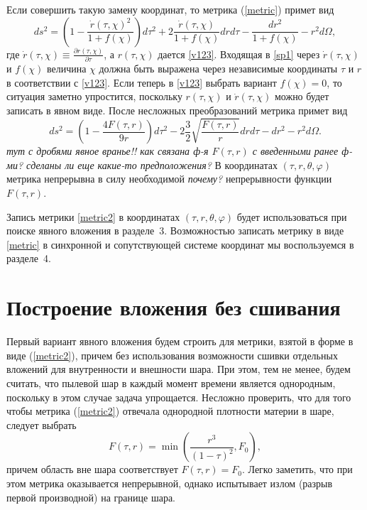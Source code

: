 \documentclass[12pt]{article}
\newcommand{\bq}{\begin{equation}}
\newcommand{\eq}{\end{equation}}
\begin{document}
Если совершить такую замену координат, то метрика (\ref{metric}) примет вид
\bq\label{sp1}
	d s^2 = \left( 1- \frac{\dot{r}(\tau, \chi)^2}{1+f(\chi)}\right) d \tau^2 + 2\frac{\dot{r}(\tau, \chi)}{1+f(\chi)}dr d\tau - \frac{dr^2}{1+f(\chi)} - r^2 d\Omega,
\eq
где $\dot{r}(\tau, \chi) \equiv \frac{\partial r(\tau, \chi)}{\partial \tau}$, а $r(\tau, \chi)$ дается \eqref{v123}.
Входящая в \eqref{sp1} через $\dot{r}(\tau, \chi)$ и $f(\chi)$ величина $\chi$
должна быть выражена через независимые координаты $\tau$ и $r$ в соответствии с \eqref{v123}. 
Если теперь в \eqref{v123} выбрать вариант $f(\chi)=0$, то ситуация заметно упростится, поскольку
 $r(\tau, \chi)$ и $\dot{r}(\tau, \chi)$ можно будет записать в явном виде. После несложных преобразований метрика примет вид
\bq
\label{metric2}
	d s^2 = \left(1-\frac{4F(\tau, r)}{9 r} \right)d\tau^2 - 2 \frac{3}{2}\sqrt{\frac{F(\tau, r)}{r}}dr d\tau  - dr^2 - r^2 d\Omega.
\eq
\emph{тут с дробями явное вранье!! как связана ф-я $F(\tau, r)$ с введенными ранее ф-ми? сделаны ли еще какие-то предположения?}
В координатах $(\tau, r, \theta, \varphi)$ метрика непрерывна в силу необходимой \emph{почему?} непрерывности функции $F(\tau, r)$.

Запись метрики \eqref{metric2} в координатах $(\tau, r, \theta, \varphi)$ будет использоваться при поиске явного вложения в разделе~3.
Возможностью записать метрику в виде \eqref{metric} в синхронной и сопутствующей системе координат мы воспользуемся в разделе~4.



\section{Построение вложения без сшивания}
Первый вариант явного вложения будем строить для метрики, взятой в форме в виде (\ref{metric2}),
причем без использования возможности сшивки отдельных вложений для внутренности и внешности шара.
При этом, тем не менее, будем считать, что пылевой шар в каждый момент времени является однородным, поскольку
в этом случае задача упрощается.
Несложно проверить, что для того чтобы метрика (\ref{metric2}) отвечала однородной плотности материи в шаре, следует выбрать
\bq\label{sp2}
	F(\tau, r) = \min{ \left( \frac{r^3}{(1-\tau)^2}, F_0 \right) },
\eq
причем область вне шара соответствует $F(\tau, r)=F_0$.
Легко заметить, что при этом метрика оказывается непрерывной, однако испытывает излом (разрыв первой производной) на границе шара.
\end{document}
